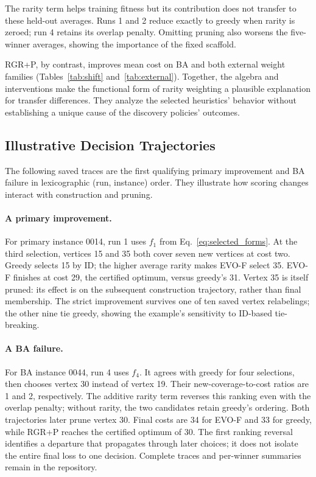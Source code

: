 \begin{samepage}
The rarity term helps training fitness but its contribution does not
transfer to these held-out averages. Runs 1 and 2 reduce exactly to
greedy when rarity is zeroed; run 4 retains its overlap penalty.
Omitting pruning also worsens the five-winner averages, showing the
importance of the fixed scaffold.\par
\end{samepage}

RGR+P, by contrast, improves mean cost on BA and both external weight
families (Tables~\ref{tab:shift} and~\ref{tab:external}).
Together, the algebra and interventions make the functional form of
rarity weighting a plausible explanation for transfer differences.
They analyze the selected heuristics' behavior without establishing a
unique cause of the discovery policies' outcomes.

\subsection{Illustrative Decision Trajectories}

The following saved traces are the first qualifying primary improvement
and BA failure in lexicographic (run, instance) order. They illustrate
how scoring changes interact with construction and pruning.

\paragraph{A primary improvement.}
For primary instance 0014, run 1 uses $f_1$ from
Eq.~\eqref{eq:selected_forms}. At the third selection, vertices 15 and 35
both cover seven new vertices at cost two. Greedy selects 15 by ID;
the higher average rarity makes EVO-F select 35. EVO-F finishes at
cost 29, the certified optimum, versus greedy's 31. Vertex 35 is
itself pruned: its effect is on the subsequent construction trajectory,
rather than final membership. The strict improvement survives one of
ten saved vertex relabelings; the other nine tie greedy, showing the
example's sensitivity to ID-based tie-breaking.

\paragraph{A BA failure.}
For BA instance 0044, run 4 uses $f_4$.
It agrees with greedy for four selections, then chooses vertex 30
instead of vertex 19. Their new-coverage-to-cost ratios are 1 and 2,
respectively. The additive rarity term reverses this ranking even
with the overlap penalty; without rarity, the two candidates retain
greedy's ordering. Both trajectories later prune vertex 30.
Final costs are 34 for EVO-F and 33 for greedy, while RGR+P reaches
the certified optimum of 30. The first ranking reversal identifies a
departure that propagates through later choices; it does not isolate
the entire final loss to one decision. Complete traces and per-winner
summaries remain in the repository.
